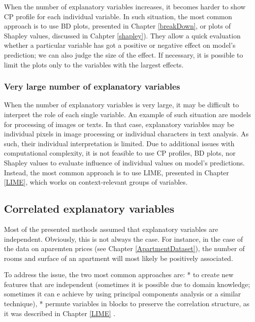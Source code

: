 \documentclass[12pt,]{krantz}
\begin{document}
When the number of explanatory variables increases, it becomes harder to show CP profile for each individual variable. In such situation, the most common approach is to use BD plots, presented in Chapter \ref{breakDown}, or plots of Shapley values, discussed in Cahpter \ref{shapley}). They allow a quick evaluation whether a particular variable has got a positive or negative effect on model's prediction; we can also judge the size of the effect. If necessary, it is possible to limit the plots only to the variables with the largest effects.

\hypertarget{very-large-number-of-explanatory-variables}{%
\subsubsection{Very large number of explanatory variables}\label{very-large-number-of-explanatory-variables}}

When the number of explanatory variables is very large, it may be difficult to interpret the role of each single variable. An example of such situation are models for processing of images or texts. In that case, explanatory variables may be individual pixels in image processing or individual characters in text analysis. As such, their individual interpretation is limited. Due to additional issues with computational complexity, it is not feasible to use CP profiles, BD plots, nor Shapley values to evaluate influence of individual values on model's predictions. Instead, the most common approach is to use LIME, presented in Chapter \ref{LIME}, which works on context-relevant groups of variables.

\hypertarget{correlated-explanatory-variables}{%
\subsection{Correlated explanatory variables}\label{correlated-explanatory-variables}}

Most of the presented methods assumed that explanatory variables are independent. Obviously, this is not always the case. For instance, in the case of the data on aparemten prices (see Chapter \ref{ApartmentDataset}), the number of rooms and surface of an apartment will most likely be positively associated.

To address the issue, the two most common approaches are:
* to create new features that are independent (sometimes it is possible due to domain knowledge; sometimes it can e achieve by using principal components analysis or a similar technique),
* permute variables in blocks to preserve the correlation structure, as it was described in Chapter \ref{LIME} .
\end{document}
